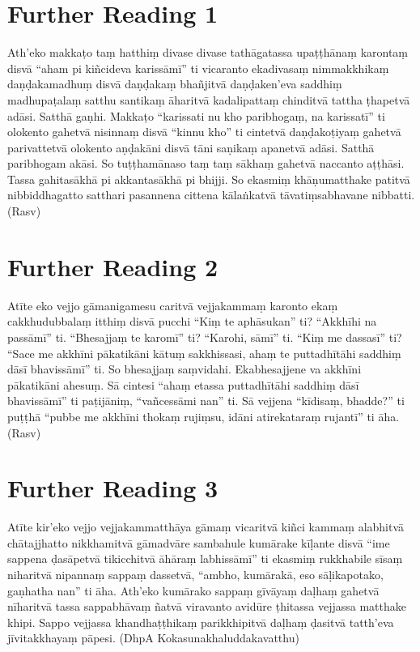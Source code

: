 \section*{Further Reading 1}

Ath’eko makkaṭo taṃ hatthiṃ divase divase tathāgatassa upaṭṭhānaṃ karontaṃ disvā “aham pi kiñcideva karissāmī” ti vicaranto ekadivasaṃ nimmakkhikaṃ daṇḍakamadhuṃ disvā daṇḍakaṃ bhañjitvā daṇḍaken’eva saddhiṃ madhupaṭalaṃ satthu santikaṃ āharitvā kadalipattaṃ chinditvā tattha ṭhapetvā adāsi. Satthā gaṇhi. Makkaṭo “karissati nu kho paribhogaṃ, na karissatī” ti olokento gahetvā nisinnaṃ disvā “kinnu kho” ti cintetvā daṇḍakoṭiyaṃ gahetvā parivattetvā olokento aṇḍakāni disvā tāni saṇikaṃ apanetvā adāsi. Satthā paribhogam akāsi. So tuṭṭhamānaso taṃ taṃ sākhaṃ gahetvā naccanto aṭṭhāsi. Tassa gahitasākhā pi akkantasākhā pi bhijji. So ekasmiṃ khāṇumatthake patitvā nibbiddhagatto satthari pasannena cittena kālaṅkatvā tāvatiṃsabhavane nibbatti. \hfill(Rasv)

\section*{Further Reading 2}

Atīte eko vejjo gāmanigamesu caritvā vejjakammaṃ karonto ekaṃ cakkhudubbalaṃ itthiṃ disvā pucchi “Kiṃ te aphāsukan” ti? “Akkhīhi na passāmī” ti. “Bhesajjaṃ te karomī” ti? “Karohi, sāmī” ti. “Kiṃ me dassasī” ti? “Sace me akkhīni pākatikāni kātuṃ sakkhissasi, ahaṃ te puttadhītāhi saddhiṃ dāsī bhavissāmī” ti. So bhesajjaṃ saṃvidahi. Ekabhesajjene va akkhīni pākatikāni ahesuṃ. Sā cintesi “ahaṃ etassa puttadhītāhi saddhiṃ dāsī bhavissāmī” ti paṭijāniṃ, “vañcessāmi nan” ti. Sā vejjena “kīdisaṃ, bhadde?” ti puṭṭhā “pubbe me akkhīni thokaṃ rujiṃsu, idāni atirekataraṃ rujantī” ti āha. \hfill(Rasv)

\section*{Further Reading 3}

Atīte kir’eko vejjo vejjakammatthāya gāmaṃ vicaritvā kiñci kammaṃ alabhitvā chātajjhatto nikkhamitvā gāmadvāre sambahule kumārake kīḷante disvā “ime sappena ḍasāpetvā tikicchitvā āhāraṃ labhissāmī” ti ekasmiṃ rukkhabile sīsaṃ niharitvā nipannaṃ sappaṃ dassetvā, “ambho, kumārakā, eso sāḷikapotako, gaṇhatha nan” ti āha. Ath’eko kumārako sappaṃ gīvāyaṃ daḷhaṃ gahetvā nīharitvā tassa sappabhāvaṃ ñatvā viravanto avidūre ṭhitassa vejjassa matthake khipi. Sappo vejjassa khandhaṭṭhikaṃ parikkhipitvā daḷhaṃ ḍasitvā tatth’eva jīvitakkhayaṃ pāpesi. \hfill(DhpA Kokasunakhaluddakavatthu)

